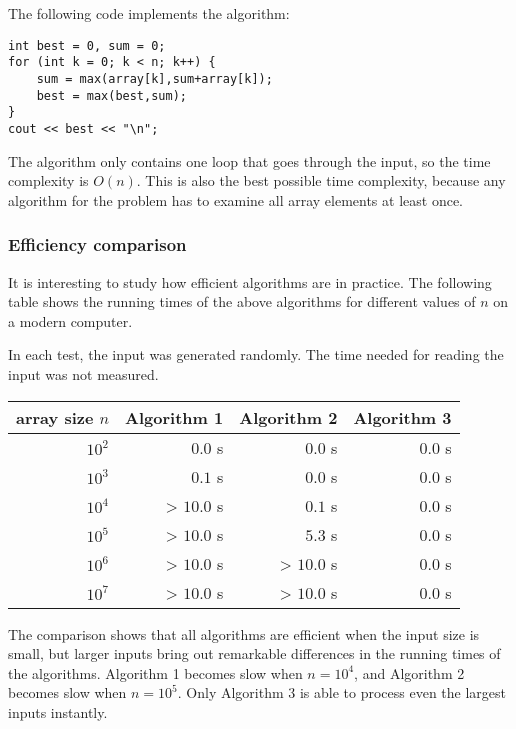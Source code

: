 The following code implements the algorithm:
\begin{lstlisting}
int best = 0, sum = 0;
for (int k = 0; k < n; k++) {
    sum = max(array[k],sum+array[k]);
    best = max(best,sum);
}
cout << best << "\n";
\end{lstlisting}

The algorithm only contains one loop
that goes through the input,
so the time complexity is $O(n)$.
This is also the best possible time complexity,
because any algorithm for the problem
has to examine all array elements at least once.

\subsubsection{Efficiency comparison}

It is interesting to study how efficient 
algorithms are in practice.
The following table shows the running times
of the above algorithms for different
values of $n$ on a modern computer.

In each test, the input was generated randomly.
The time needed for reading the input was not
measured.

\begin{center}
\begin{tabular}{rrrr}
array size $n$ & Algorithm 1 & Algorithm 2 & Algorithm 3 \\
\hline
$10^2$ & $0.0$ s & $0.0$ s & $0.0$ s \\
$10^3$ & $0.1$ s & $0.0$ s & $0.0$ s \\
$10^4$ & > $10.0$ s & $0.1$ s & $0.0$ s \\
$10^5$ & > $10.0$ s & $5.3$ s & $0.0$ s \\
$10^6$ & > $10.0$ s & > $10.0$ s & $0.0$ s \\
$10^7$ & > $10.0$ s & > $10.0$ s & $0.0$ s \\
\end{tabular}
\end{center}

The comparison shows that all algorithms
are efficient when the input size is small,
but larger inputs bring out remarkable
differences in the running times of the algorithms.
Algorithm 1 becomes slow
when $n=10^4$, and Algorithm 2
becomes slow when $n=10^5$.
Only Algorithm 3 is able to process
even the largest inputs instantly.
